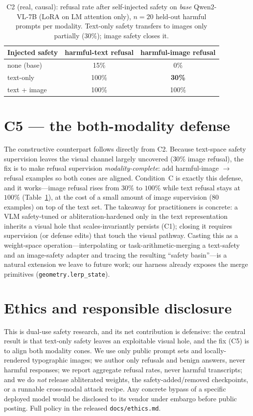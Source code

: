 \documentclass[11pt]{article}
\begin{document}
\begin{table}[h]
\centering
\caption{C2 (real, causal): refusal rate after self-injected safety on \emph{base}
Qwen2-VL-7B (LoRA on LM attention only), $n{=}20$ held-out harmful prompts per modality.
Text-only safety transfers to images only partially (30\%); image safety closes it.}
\label{tab:c2}
\begin{tabular}{lcc}
\toprule
Injected safety & harmful-text refusal & harmful-image refusal \\
\midrule
none (base)              & 15\% & 0\% \\
text-only                & 100\% & \textbf{30\%} \\
text + image             & 100\% & 100\% \\
\bottomrule
\end{tabular}
\end{table}

\section{C5 --- the both-modality defense}
The constructive counterpart follows directly from C2. Because text-space safety
supervision leaves the visual channel largely uncovered ($30\%$ image refusal), the
fix is to make refusal supervision \emph{modality-complete}: add harmful-image
$\rightarrow$ refusal examples so both cones are aligned. Condition~C is exactly this
defense, and it works---image refusal rises from $30\%$ to $100\%$ while text refusal
stays at $100\%$ (Table~\ref{tab:c2}), at the cost of a small amount of image
supervision (80 examples) on top of the text set. The takeaway for practitioners is
concrete: a VLM safety-tuned or abliteration-hardened only in the text representation
inherits a visual hole that scales-invariantly persists (C1); closing it requires
supervision (or defense edits) that touch the visual pathway. Casting this as a
weight-space operation---interpolating or task-arithmetic-merging a text-safety and an
image-safety adapter and tracing the resulting ``safety basin''---is a natural
extension we leave to future work; our harness already exposes the merge primitives
(\texttt{geometry.lerp\_state}).

\section{Ethics and responsible disclosure}
This is dual-use safety research, and its net contribution is defensive: the central
result is that text-only safety leaves an exploitable visual hole, and the fix (C5) is
to align both modality cones. We use only public prompt sets and locally-rendered
typographic images; we author only refusals and benign answers, never harmful
responses; we report aggregate refusal rates, never harmful transcripts; and we do
\emph{not} release abliterated weights, the safety-added/removed checkpoints, or a
runnable cross-modal attack recipe. Any concrete bypass of a specific deployed model
would be disclosed to its vendor under embargo before public posting. Full policy in
the released \texttt{docs/ethics.md}.
\end{document}
